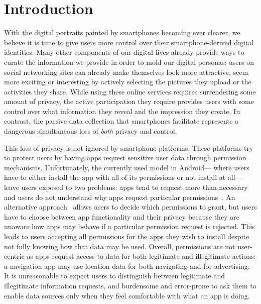 
\section{Introduction} \label{sec-introduction}

With the digital portraits painted by smartphones becoming ever clearer, we
believe it is time to give users more control over their smartphone-derived
digital identities. Many other components of our digital lives already provide
ways to curate the information we provide in order to mold our digital
personas: users on social networking sites can already make themselves look
more attractive, seem more exciting or interesting by actively selecting
the pictures they upload or the activities they share. While using these
online services requires surrendering some amount of privacy, the active
participation they require provides users with some control over what
information they reveal and the impression they create. In contrast, the
passive data collection that smartphones facilitate represents a dangerous
simultaneous loss of \textit{both} privacy and control.


This loss of privacy is not ignored by smartphone platforms. These platforms
try to protect users by having apps request sensitive user data through
permission mechanisms. Unfortunately, the currently used model in Android---
where users have to either install the app with all of its permissions or not
install at all---leave users exposed to two problems: apps tend to request more
than necessary~\cite{taintdroid-osdi,demystified-ccs11} and users do not
understand why apps request particular permissions~\cite{androidperms-soups12}.
An alternative approach~\cite{apex-asiaccs10} allows users to decide which
permissions to grant, but users have to choose between app functionality and
their privacy because they are unaware how apps may behave if a particular
permission request is rejected. This leads to users accepting all permissions
for the apps they wish to install despite not fully knowing how that data may
be used. Overall, permissions are not user-centric as apps request access to
data for both legitimate and illegitimate actions: a navigation app may use
location data for both navigating and for advertising. It is unreasonable to
expect users to distinguish between legitimate and illegitimate information
requests, and burdensome and error-prone to ask them to enable data sources
only when they feel comfortable with what an app is doing.

